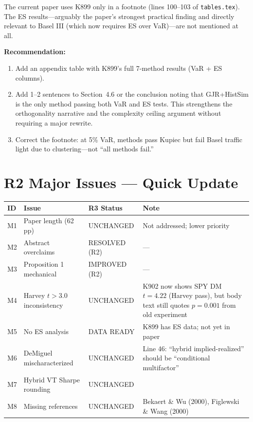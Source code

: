 \documentclass[12pt,a4paper]{article}
\begin{document}
The current paper uses K899 only in a footnote (lines 100--103 of \texttt{tables.tex}). The ES results---arguably the paper's strongest practical finding and directly relevant to Basel III (which now requires ES over VaR)---are not mentioned at all.

\textbf{Recommendation:}
\begin{enumerate}[nosep]
\item Add an appendix table with K899's full 7-method results (VaR + ES columns).
\item Add 1--2 sentences to Section~4.6 or the conclusion noting that GJR+HistSim is the only method passing both VaR and ES tests. This strengthens the orthogonality narrative and the complexity ceiling argument without requiring a major rewrite.
\item Correct the footnote: at 5\% VaR, methods pass Kupiec but fail Basel traffic light due to clustering---not ``all methods fail.''
\end{enumerate}


\bigskip

\section*{R2 Major Issues --- Quick Update}

\begin{tabular}{p{1cm}p{5cm}p{2.5cm}p{5.5cm}}
\toprule
\textbf{ID} & \textbf{Issue} & \textbf{R3 Status} & \textbf{Note} \\
\midrule
M1 & Paper length (62 pp) & \textcolor{warncolor}{UNCHANGED} & Not addressed; lower priority \\
M2 & Abstract overclaims & \textcolor{okgreen}{RESOLVED (R2)} & --- \\
M3 & Proposition 1 mechanical & \textcolor{okgreen}{IMPROVED (R2)} & --- \\
M4 & Harvey $t > 3.0$ inconsistency & \textcolor{warncolor}{UNCHANGED} & K902 now shows SPY DM $t = 4.22$ (Harvey pass), but body text still quotes $p = 0.001$ from old experiment \\
M5 & No ES analysis & \textcolor{warncolor}{DATA READY} & K899 has ES data; not yet in paper \\
M6 & DeMiguel mischaracterized & \textcolor{warncolor}{UNCHANGED} & Line 46: ``hybrid implied-realized'' should be ``conditional multifactor'' \\
M7 & Hybrid VT Sharpe rounding & \textcolor{warncolor}{UNCHANGED} & \\
M8 & Missing references & \textcolor{warncolor}{UNCHANGED} & Bekaert \& Wu (2000), Figlewski \& Wang (2000) \\
\bottomrule
\end{tabular}
\end{document}
